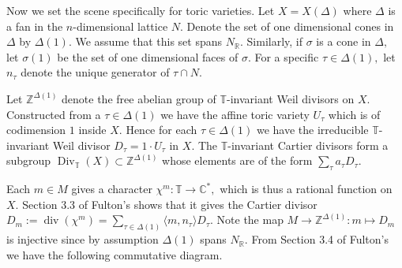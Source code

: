 \documentclass[BSc]{usydthesis}
\numberwithin{equation}{chapter}
\theoremstyle{remark}
\newcommand{\R}{\mathbb{R}}
\newcommand{\C}{\mathbb{C}}
\newcommand{\Z}{\mathbb{Z}}
\newcommand{\T}{\mathbb{T}}
\begin{document}
Now we set the scene specifically for toric varieties. Let $X= X(\Delta)$ where $\Delta$ is a fan in the $n$-dimensional lattice $N.$ Denote the set of one dimensional cones in $\Delta$ by $\Delta(1)$. We assume that this set spans $N_{\R}.$ Similarly, if $\sigma$ is a cone in $\Delta,$ let $\sigma(1)$ be the set of one dimensional faces of $\sigma.$ For a specific $\tau \in \Delta(1),$ let $n_{\tau}$ denote the unique generator of $\tau \cap N.$ 
\newline

Let $\Z^{\Delta(1)}$ denote the free abelian group of $\T$-invariant Weil divisors on $X.$ Constructed from a $\tau \in \Delta(1)$ we have the affine toric variety $U_{\tau}$ which is of codimension $1$ inside $X.$ Hence for each $\tau \in \Delta(1)$ we have the irreducible $\T$-invariant Weil divisor $D_{\tau} = 1\cdot U_{\tau}$ in $X.$ The $\T$-invariant Cartier divisors form a subgroup $\operatorname{Div}_{\T}(X) \subset \Z^{\Delta(1)}$ whose elements are of the form $\sum_{\tau} a_\tau D_{\tau}.$  
\newline

Each $m\in M$ gives a character $\chi^m : \T \to \C^*,$ which is thus a rational function on $X.$ Section 3.3 of Fulton's \cite{Fulton:Toric} shows that it gives the Cartier divisor $ D_m:= \operatorname{div}(\chi^m) = \sum_{\tau\in \Delta(1)} \langle m, n_{\tau} \rangle D_{\tau}.$ Note the map $M\to \Z^{\Delta(1)} : m \mapsto D_m$ is injective since by assumption $\Delta(1)$ spans $N_{\R}.$ From Section 3.4 of Fulton's \cite{Fulton:Toric} we have the following commutative diagram. 
\newline

\begin{center}
 
\end{center}
\end{document}
